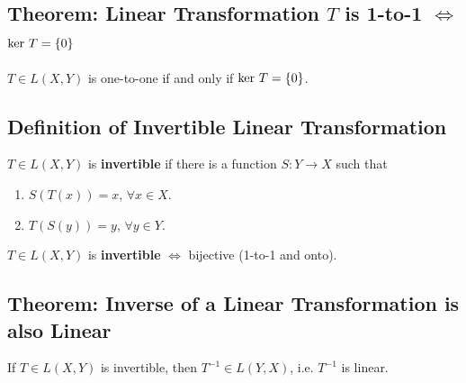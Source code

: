 \documentclass[11pt]{elegantbook}
\begin{document}
\subsection{Theorem: Linear Transformation $T$ is 1-to-1 $\Leftrightarrow$ $\textnormal{ker }T = \{0\}$}
\begin{theorem}[1-to-1 $\Leftrightarrow$ $\textnormal{ker }T = \{0\}$]
    $T \in L(X, Y)$ is one-to-one if and only if $\textnormal{ker }T = \{0\}$.
\end{theorem}


\subsection{Definition of Invertible Linear Transformation}
\begin{definition}
    \normalfont
    $T \in L(X, Y)$ is \textbf{invertible} if there is a function $S : Y \rightarrow X$ such that
    \begin{enumerate}
        \item $S(T(x))=x$, $\forall x\in X$.
        \item $T(S(y))=y$, $\forall y\in Y$.
    \end{enumerate}
\end{definition}
\begin{proposition}
    $T \in L(X, Y)$ is \textbf{invertible} $\Leftrightarrow$ bijective (1-to-1 and onto).
\end{proposition}

\subsection{Theorem: Inverse of a Linear Transformation is also Linear}
\begin{theorem}
    If $T \in L(X, Y)$ is invertible, then $T^{-1} \in L(Y, X)$, i.e. $T^{-1}$ is linear.
\end{theorem}
\end{document}
